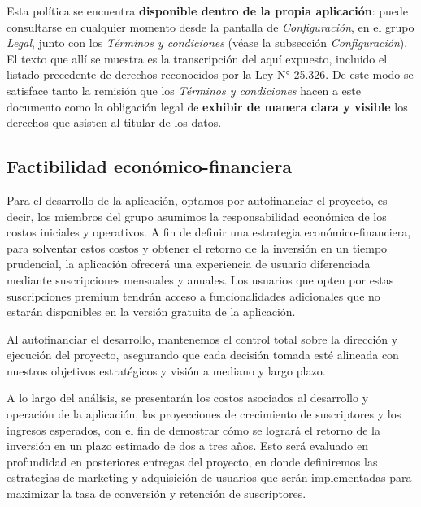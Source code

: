 \documentclass[a4paper,12pt]{article}
\begin{document}
    \par Esta política se encuentra \textbf{disponible dentro de la propia aplicación}: puede consultarse en cualquier momento desde la pantalla de \textit{Configuración}, en el grupo \textit{Legal}, junto con los \textit{Términos y condiciones} (véase la subsección \textit{Configuración}). El texto que allí se muestra es la transcripción del aquí expuesto, incluido el listado precedente de derechos reconocidos por la Ley N° 25.326. De este modo se satisface tanto la remisión que los \textit{Términos y condiciones} hacen a este documento como la obligación legal de \textbf{exhibir de manera clara y visible} los derechos que asisten al titular de los datos.
    \subsection{Factibilidad económico-financiera}
    \par Para el desarrollo de la aplicación, optamos por autofinanciar el proyecto, es decir, los miembros del grupo asumimos la responsabilidad económica de los costos iniciales y operativos. A fin de definir una estrategia económico-financiera, para solventar estos costos y obtener el retorno de la inversión en un tiempo prudencial, la aplicación ofrecerá una experiencia de usuario diferenciada mediante suscripciones mensuales y anuales. Los usuarios que opten por estas suscripciones premium tendrán acceso a funcionalidades adicionales que no estarán disponibles en la versión gratuita de la aplicación.
    \par Al autofinanciar el desarrollo, mantenemos el control total sobre la dirección y ejecución del proyecto, asegurando que cada decisión tomada esté alineada con nuestros objetivos estratégicos y visión a mediano y largo plazo.
    \par A lo largo del análisis, se presentarán los costos asociados al desarrollo y operación de la aplicación, las proyecciones de crecimiento de suscriptores y los ingresos esperados, con el fin de demostrar cómo se logrará el retorno de la inversión en un plazo estimado de dos a tres años. Esto será evaluado en profundidad en posteriores entregas del proyecto, en donde definiremos las estrategias de marketing y adquisición de usuarios que serán implementadas para maximizar la tasa de conversión y retención de suscriptores.
\end{document}
